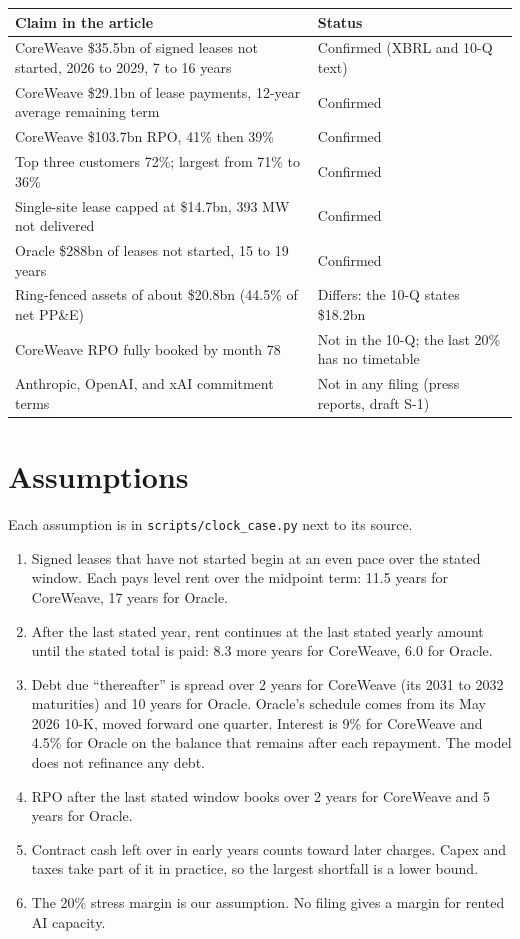 \documentclass[11pt,a4paper]{article}
\newcommand{\code}[1]{\texttt{\small #1}}
\begin{document}
\begin{tabularx}{\linewidth}{@{}Xl@{}}\toprule
Claim in the article & Status \\\midrule
CoreWeave \$35.5bn of signed leases not started, 2026 to 2029, 7 to 16 years & \textcolor{good}{Confirmed} (XBRL and 10-Q text) \\
CoreWeave \$29.1bn of lease payments, 12-year average remaining term & \textcolor{good}{Confirmed} \\
CoreWeave \$103.7bn RPO, 41\% then 39\% & \textcolor{good}{Confirmed} \\
Top three customers 72\%; largest from 71\% to 36\% & \textcolor{good}{Confirmed} \\
Single-site lease capped at \$14.7bn, 393 MW not delivered & \textcolor{good}{Confirmed} \\
Oracle \$288bn of leases not started, 15 to 19 years & \textcolor{good}{Confirmed} \\
Ring-fenced assets of about \$20.8bn (44.5\% of net PP\&E) & \textcolor{bad}{Differs}: the 10-Q states \$18.2bn \\
CoreWeave RPO fully booked by month 78 & \textcolor{bad}{Not in the 10-Q}; the last 20\% has no timetable \\
Anthropic, OpenAI, and xAI commitment terms & Not in any filing (press reports, draft S-1) \\\bottomrule
\end{tabularx}

\section{Assumptions}
Each assumption is in \code{scripts/clock\_case.py} next to its source.
\begin{enumerate}
\item Signed leases that have not started begin at an even pace over the stated window. Each pays level rent over the midpoint term: 11.5 years for CoreWeave, 17 years for Oracle.
\item After the last stated year, rent continues at the last stated yearly amount until the stated total is paid: 8.3 more years for CoreWeave, 6.0 for Oracle.
\item Debt due ``thereafter'' is spread over 2 years for CoreWeave (its 2031 to 2032 maturities) and 10 years for Oracle. Oracle's schedule comes from its May 2026 10-K, moved forward one quarter. Interest is 9\% for CoreWeave and 4.5\% for Oracle on the balance that remains after each repayment. The model does not refinance any debt.
\item RPO after the last stated window books over 2 years for CoreWeave and 5 years for Oracle.
\item Contract cash left over in early years counts toward later charges. Capex and taxes take part of it in practice, so the largest shortfall is a lower bound.
\item The 20\% stress margin is our assumption. No filing gives a margin for rented AI capacity.
\end{enumerate}
\end{document}
